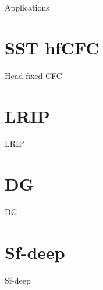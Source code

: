 Applications

\section{SST hfCFC}
Head-fixed CFC

\section{LRIP}
LRIP

\section{DG}
DG

\section{Sf-deep}
Sf-deep